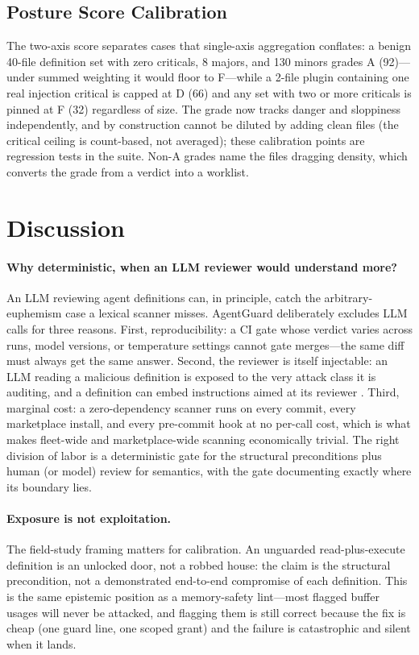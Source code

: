 \documentclass[11pt]{article}
\begin{document}
\subsection{Posture Score Calibration}
The two-axis score separates cases that single-axis aggregation conflates: a benign 40-file
definition set with zero criticals, 8 majors, and 130 minors grades A (92)---under summed
weighting it would floor to F---while a 2-file plugin containing one real injection critical is
capped at D (66) and any set with two or more criticals is pinned at F (32) regardless of size.
The grade now tracks danger and sloppiness independently, and by construction cannot be diluted by
adding clean files (the critical ceiling is count-based, not averaged); these calibration points
are regression tests in the suite. Non-A grades name the files dragging density, which converts
the grade from a verdict into a worklist.

\section{Discussion}

\paragraph{Why deterministic, when an LLM reviewer would understand more?}
An LLM reviewing agent definitions can, in principle, catch the arbitrary-euphemism case a lexical
scanner misses. AgentGuard deliberately excludes LLM calls for three reasons. First,
reproducibility: a CI gate whose verdict varies across runs, model versions, or temperature
settings cannot gate merges---the same diff must always get the same answer. Second, the reviewer
is itself injectable: an LLM reading a malicious definition is exposed to the very attack class it
is auditing, and a definition can embed instructions aimed at its reviewer
\cite{greshake2023indirect}. Third, marginal cost: a zero-dependency scanner runs on every commit,
every marketplace install, and every pre-commit hook at no per-call cost, which is what makes
fleet-wide and marketplace-wide scanning economically trivial. The right division of labor is a
deterministic gate for the structural preconditions plus human (or model) review for semantics,
with the gate documenting exactly where its boundary lies.

\paragraph{Exposure is not exploitation.}
The field-study framing matters for calibration. An unguarded read-plus-execute definition is an
unlocked door, not a robbed house: the claim is the structural precondition, not a demonstrated
end-to-end compromise of each definition. This is the same epistemic position as a memory-safety
lint---most flagged buffer usages will never be attacked, and flagging them is still correct
because the fix is cheap (one guard line, one scoped grant) and the failure is catastrophic and
silent when it lands.
\end{document}
